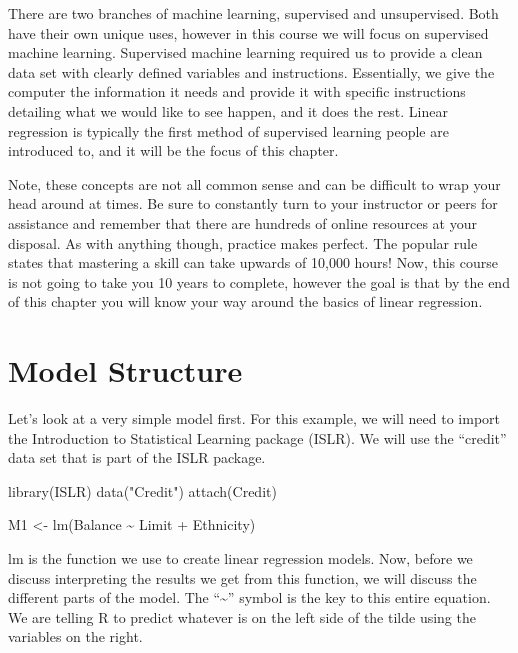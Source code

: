 \documentclass[
]{book}
\newenvironment{Shaded}{\begin{snugshade}}{\end{snugshade}}
\newcommand{\FunctionTok}[1]{\textcolor[rgb]{0.00,0.00,0.00}{#1}}
\newcommand{\NormalTok}[1]{#1}
\newcommand{\OtherTok}[1]{\textcolor[rgb]{0.56,0.35,0.01}{#1}}
\newcommand{\SpecialCharTok}[1]{\textcolor[rgb]{0.00,0.00,0.00}{#1}}
\newcommand{\StringTok}[1]{\textcolor[rgb]{0.31,0.60,0.02}{#1}}
\begin{document}
There are two branches of machine learning, supervised and unsupervised. Both have their own unique uses, however in this course we will focus on supervised machine learning. Supervised machine learning required us to provide a clean data set with clearly defined variables and instructions. Essentially, we give the computer the information it needs and provide it with specific instructions detailing what we would like to see happen, and it does the rest. Linear regression is typically the first method of supervised learning people are introduced to, and it will be the focus of this chapter.

Note, these concepts are not all common sense and can be difficult to wrap your head around at times. Be sure to constantly turn to your instructor or peers for assistance and remember that there are hundreds of online resources at your disposal. As with anything though, practice makes perfect. The popular rule states that mastering a skill can take upwards of 10,000 hours! Now, this course is not going to take you 10 years to complete, however the goal is that by the end of this chapter you will know your way around the basics of linear regression.

\hypertarget{model-structure}{%
\section{Model Structure}\label{model-structure}}

Let's look at a very simple model first. For this example, we will need to import the Introduction to Statistical Learning package (ISLR). We will use the ``credit'' data set that is part of the ISLR package.

\begin{Shaded}
\begin{Highlighting}[]
\FunctionTok{library}\NormalTok{(ISLR)}
\FunctionTok{data}\NormalTok{(}\StringTok{"Credit"}\NormalTok{)}
\FunctionTok{attach}\NormalTok{(Credit)}

\NormalTok{M1 }\OtherTok{\textless{}{-}} \FunctionTok{lm}\NormalTok{(Balance }\SpecialCharTok{\textasciitilde{}}\NormalTok{ Limit }\SpecialCharTok{+}\NormalTok{ Ethnicity)}
\end{Highlighting}
\end{Shaded}

lm is the function we use to create linear regression models. Now, before we discuss interpreting the results we get from this function, we will discuss the different parts of the model. The ``\textasciitilde{}'' symbol is the key to this entire equation. We are telling R to predict whatever is on the left side of the tilde using the variables on the right.
\end{document}
